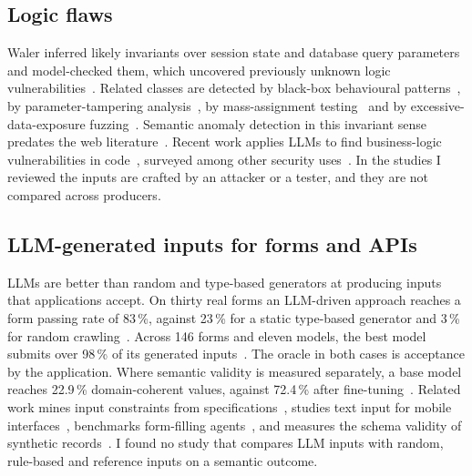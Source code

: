 \documentclass[conference]{IEEEtran}
\begin{document}
\subsection{Logic flaws}
Waler inferred likely invariants over session state and database query parameters and model-checked
them, which uncovered previously unknown logic vulnerabilities~\cite{felmetsger2010waler}. Related
classes are detected by black-box behavioural patterns~\cite{pellegrino2014logicflaws}, by
parameter-tampering analysis~\cite{bisht2010notamper}, by mass-assignment
testing~\cite{corradini2023massassignment} and by excessive-data-exposure
fuzzing~\cite{pan2024edefuzz}. Semantic anomaly detection in this invariant sense predates the web
literature~\cite{raz2002semanticanomaly}. Recent work applies LLMs to find business-logic
vulnerabilities in code~\cite{metin2025blv,armillotta2026antaeus}, surveyed among other security
uses~\cite{sheng2025llmsecsurvey}. In the studies I reviewed the inputs are crafted by an attacker or
a tester, and they are not compared across producers.

\subsection{LLM-generated inputs for forms and APIs}
LLMs are better than random and type-based generators at producing inputs that applications accept. On
thirty real forms an LLM-driven approach reaches a form passing rate of 83\,\%, against 23\,\% for a
static type-based generator and 3\,\% for random crawling~\cite{alian2024formnexus}. Across 146 forms
and eleven models, the best model submits over 98\,\% of its generated inputs~\cite{li2026webformtest}.
The oracle in both cases is acceptance by the application. Where semantic validity is measured
separately, a base model reaches 22.9\,\% domain-coherent values, against 72.4\,\% after
fine-tuning~\cite{kim2025llamaresttest}. Related work mines input constraints from
specifications~\cite{kim2024restgpt,huynh2024constraints}, studies text input for mobile
interfaces~\cite{cui2024guitextinput}, benchmarks form-filling agents~\cite{li2025formfactory}, and
measures the schema validity of synthetic records~\cite{mishra2026structuredsynthetic}. I found no
study that compares LLM inputs with random, rule-based and reference inputs on a semantic outcome.
\end{document}
